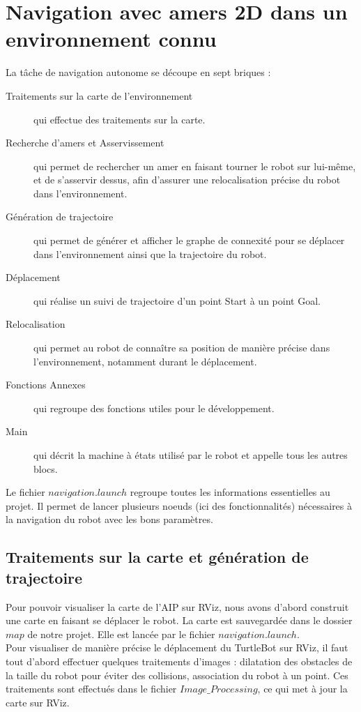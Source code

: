 \documentclass[10pt,a4paper]{article}
\begin{document}
\section{Navigation avec amers 2D dans un environnement connu}
\label{sec:navigation_avec_amers_2D_dans_un_environnement_connu}

La tâche de navigation autonome se découpe en sept briques : 
\begin{description}
\item [Traitements sur la carte de l'environnement] qui effectue des traitements sur la carte.
\item [Recherche d'amers et Asservissement] qui permet de rechercher un amer en faisant tourner le robot sur lui-même, et de s'asservir dessus, afin d'assurer une relocalisation précise du robot dans l'environnement.
\item [Génération de trajectoire] qui permet de générer et afficher le graphe de connexité pour se déplacer dans l'environnement ainsi que la trajectoire du robot.
\item [Déplacement] qui réalise un suivi de trajectoire d'un point Start à un point Goal.
\item [Relocalisation] qui permet au robot de connaître sa position de manière précise dans l'environnement, notamment durant le déplacement.
\item [Fonctions Annexes] qui regroupe des fonctions utiles pour le développement.
\item [Main] qui décrit la machine à états utilisé par le robot et appelle tous les autres blocs.
\end{description}


Le fichier $navigation.launch$ regroupe toutes les informations essentielles au projet. Il permet de lancer plusieurs noeuds (ici des fonctionnalités) nécessaires à la navigation du robot avec les bons paramètres.


\subsection{Traitements sur la carte et génération de trajectoire}
\label{sec:traitements}

Pour pouvoir visualiser la carte de l'AIP sur RViz, nous avons d'abord construit une carte en faisant se déplacer le robot. La carte est sauvegardée dans le dossier $map$ de notre projet. Elle est lancée par le fichier $navigation.launch$.\\

Pour visualiser de manière précise le déplacement du TurtleBot sur RViz, il faut tout d'abord effectuer quelques traitements d'images : dilatation des obstacles de la taille du robot pour éviter des collisions, association du robot à un point. Ces traitements sont effectués dans le fichier $Image\_Processing$, ce qui met à jour la carte sur RViz.\\
\end{document}
